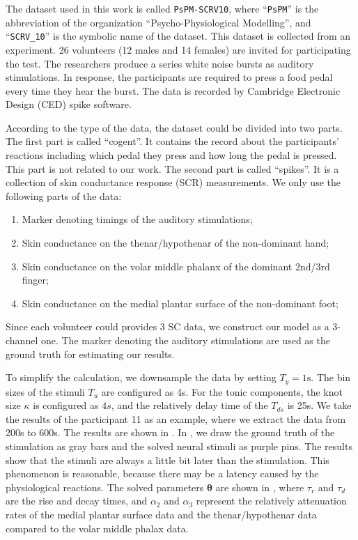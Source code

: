 \documentclass[10pt,conference]{ieeeconf}
\providecommand{\rm}[1]{\mathrm{#1}}
\begin{document}
The dataset used in this work is called \texttt{PsPM-SCRV10}\cite{bach2014pspm}, where ``\texttt{PsPM}'' is the abbreviation of the organization ``Psycho-Physiological Modelling'', and ``\texttt{SCRV\_10}'' is the symbolic name of the dataset. This dataset is collected from an experiment. 26 volunteers (12 males and 14 females) are invited for participating the test. The researchers produce a series white noise bursts as auditory stimulations. In response, the participants are required to press a food pedal every time they hear the burst. The data is recorded by Cambridge Electronic Design (CED) spike software.

According to the type of the data, the dataset could be divided into two parts. The first part is called ``cogent''. It contains the record about the participants' reactions including which pedal they press and how long the pedal is pressed. This part is not related to our work. The second part is called ``spikes''. It is a collection of skin conductance response (SCR) measurements. We only use the following parts of the data:

\begin{enumerate}
  \item Marker denoting timings of the auditory stimulations;
  \item Skin conductance on the thenar/hypothenar of the non-dominant hand;
  \item Skin conductance on the volar middle phalanx of the dominant 2nd/3rd finger;
  \item Skin conductance on the medial plantar surface of the non-dominant foot;
\end{enumerate}

Since each volunteer could provides 3 SC data, we construct our model as a 3-channel one. The marker denoting the auditory stimulations are used as the ground truth for estimating our results.

To simplify the calculation, we downsample the data by setting $T_y=1\rm{s}$. The bin sizes of the stimuli $T_u$ are configured as 4s. For the tonic components, the knot size $\kappa$ is configured as $4s$, and the relatively delay time of the $T_{ds}$ is 25s. We take the results of the participant 11 as an example, where we extract the data from 200s to 600s. The results are shown in . In , we draw the ground truth of the stimulation as gray bars and the solved neural stimuli as purple pins. The results show that the stimuli are always a little bit later than the stimulation. This phenomenon is reasonable, because there may be a latency caused by the physiological reactions. The solved parameters $\boldsymbol{\theta}$ are shown in , where $\tau_r$ and $\tau_d$ are the rise and decay times, and $\alpha_2$ and $\alpha_3$ represent the relatively attenuation rates of the medial plantar surface data and the thenar/hypothenar data compared to the volar middle phalax data.
\end{document}

